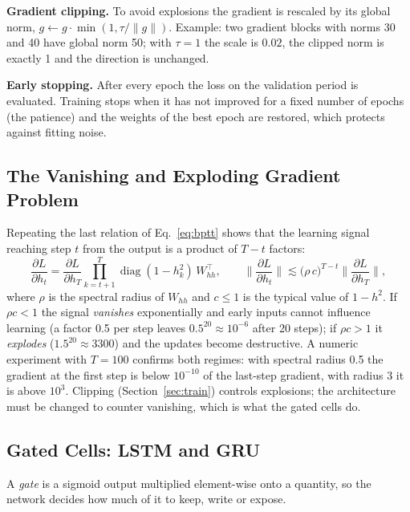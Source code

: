 \documentclass[11pt, a4paper]{article}
\begin{document}
\textbf{Gradient clipping.} To avoid explosions the gradient is rescaled by its global norm, $g\leftarrow g\cdot\min(1,\tau/\|g\|)$. Example: two gradient blocks with norms 30 and 40 have global norm 50;
with $\tau=1$ the scale is $0.02$, the clipped norm is exactly 1 and the direction is unchanged.

\textbf{Early stopping.} After every epoch the loss on the validation period is evaluated. Training stops when it has not improved for a fixed number of epochs (the patience) and the weights of the best epoch are restored,
which protects against fitting noise.

\subsection{The Vanishing and Exploding Gradient Problem}
\label{sec:vanish}

Repeating the last relation of Eq.~\eqref{eq:bptt} shows that the learning signal reaching step $t$ from the output is a product of $T-t$ factors:
\begin{equation}
\frac{\partial L}{\partial h_t}=\frac{\partial L}{\partial h_T}\prod_{k=t+1}^{T}\operatorname{diag}(1-h_k^2)\,W_{hh}^\top,
\qquad
\Big\|\frac{\partial L}{\partial h_t}\Big\|\lesssim\big(\rho\,c\big)^{T-t}\Big\|\frac{\partial L}{\partial h_T}\Big\|,
\end{equation}
where $\rho$ is the spectral radius of $W_{hh}$ and $c\le1$ is the typical value of $1-h^2$. If $\rho c<1$ the signal \emph{vanishes} exponentially and early inputs cannot influence learning
(a factor 0.5 per step leaves $0.5^{20}\approx10^{-6}$ after 20 steps); if $\rho c>1$ it \emph{explodes} ($1.5^{20}\approx3300$) and the updates become destructive.
A numeric experiment with $T=100$ confirms both regimes: with spectral radius 0.5 the gradient at the first step is below $10^{-10}$ of the last-step gradient, with radius 3 it is above $10^{3}$.
Clipping (Section~\ref{sec:train}) controls explosions; the architecture must be changed to counter vanishing, which is what the gated cells do.

\subsection{Gated Cells: LSTM and GRU}
\label{sec:gates}

A \emph{gate} is a sigmoid output multiplied element-wise onto a quantity, so the network decides how much of it to keep, write or expose.
\end{document}
